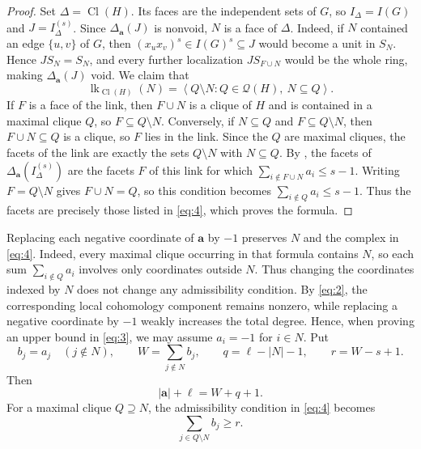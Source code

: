 \documentclass[11pt]{amsart}
\newtheorem{proposition}[theorem]{Proposition}
\theoremstyle{definition}
\newcommand{\cQ}{\mathcal Q}
\begin{document}
\begin{proof}
Set $\Delta=\operatorname{Cl}(H)$. Its faces are the independent sets of $G$, so $I_\Delta=I(G)$ and $J=I_\Delta^{(s)}$. Since $\Delta_{\mathbf a}(J)$ is nonvoid, $N$ is a face of $\Delta$. Indeed, if $N$ contained an edge $\{u,v\}$ of $G$, then $(x_ux_v)^s\in I(G)^s\subseteq J$ would become a unit in $S_N$. Hence $JS_N=S_N$, and every further localization $JS_{F\cup N}$ would be the whole ring, making $\Delta_{\mathbf a}(J)$ void. We claim that
\[
\operatorname{lk}_{\operatorname{Cl}(H)}(N)
=
\left\langle Q\setminus N:
Q\in\cQ(H),\ N\subseteq Q\right\rangle.
\]
If $F$ is a face of the link, then $F\cup N$ is a clique of $H$ and is contained in a maximal clique $Q$, so $F\subseteq Q\setminus N$. Conversely, if $N\subseteq Q$ and $F\subseteq Q\setminus N$, then $F\cup N\subseteq Q$ is a clique, so $F$ lies in the link. Since the $Q$ are maximal cliques, the facets of the link are exactly the sets $Q\setminus N$ with $N\subseteq Q$. By \cite[Lemma~1.3]{HoaTrung2016}, the facets of $\Delta_{\mathbf a}(I_\Delta^{(s)})$ are the facets $F$ of this link for which $\sum_{i\notin F\cup N}a_i\le s-1$. Writing $F=Q\setminus N$ gives $F\cup N=Q$, so this condition becomes $\sum_{i\notin Q}a_i\le s-1$. Thus the facets are precisely those listed in \cref{eq:4}, which proves the formula.
\end{proof}

Replacing each negative coordinate of $\mathbf a$ by $-1$ preserves $N$ and the complex in \cref{eq:4}. Indeed, every maximal clique occurring in that formula contains $N$, so each sum $\sum_{i\notin Q}a_i$ involves only coordinates outside $N$. Thus changing the coordinates indexed by $N$ does not change any admissibility condition. By \cref{eq:2}, the corresponding local cohomology component remains nonzero, while replacing a negative coordinate by $-1$ weakly increases the total degree. Hence, when proving an upper bound in \cref{eq:3}, we may assume $a_i=-1$ for $i\in N$. Put
\begin{equation}\label{eq:5}
b_j=a_j\quad(j\notin N),
\qquad
W=\sum_{j\notin N}b_j,
\qquad
q=\ell-|N|-1,
\qquad
r=W-s+1.
\end{equation}
Then
\begin{equation}\label{eq:6}
|\mathbf a|+\ell=W+q+1.
\end{equation}
For a maximal clique $Q\supseteq N$, the admissibility condition in \cref{eq:4} becomes
\begin{equation}\label{eq:7}
\sum_{j\in Q\setminus N}b_j\ge r.
\end{equation}
\end{document}
